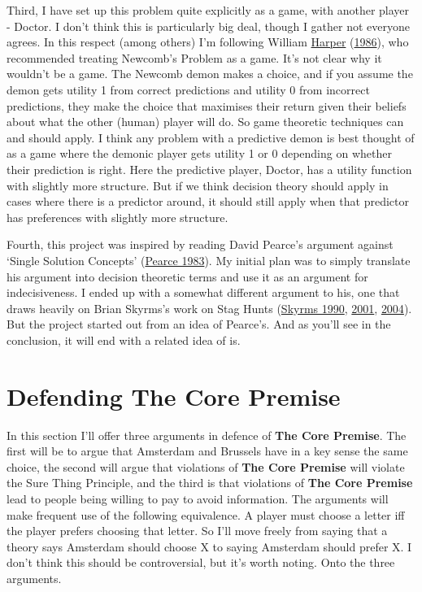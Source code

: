 \documentclass[
  12pt,
]{article}
\begin{document}
Third, I have set up this problem quite explicitly as a game, with
another player - Doctor. I don't think this is particularly big deal,
though I gather not everyone agrees. In this respect (among others) I'm
following William \protect\hyperlink{ref-Harper1986}{Harper}
(\protect\hyperlink{ref-Harper1986}{1986}), who recommended treating
Newcomb's Problem as a game. It's not clear why it wouldn't be a game.
The Newcomb demon makes a choice, and if you assume the demon gets
utility 1 from correct predictions and utility 0 from incorrect
predictions, they make the choice that maximises their return given
their beliefs about what the other (human) player will do. So game
theoretic techniques can and should apply. I think any problem with a
predictive demon is best thought of as a game where the demonic player
gets utility 1 or 0 depending on whether their prediction is right. Here
the predictive player, Doctor, has a utility function with slightly more
structure. But if we think decision theory should apply in cases where
there is a predictor around, it should still apply when that predictor
has preferences with slightly more structure.

Fourth, this project was inspired by reading David Pearce's argument
against `Single Solution Concepts'
(\protect\hyperlink{ref-Pearce1983}{Pearce 1983}). My initial plan was
to simply translate his argument into decision theoretic terms and use
it as an argument for indecisiveness. I ended up with a somewhat
different argument to his, one that draws heavily on Brian Skyrms's work
on Stag Hunts (\protect\hyperlink{ref-Skyrms1990}{Skyrms 1990},
\protect\hyperlink{ref-Skyrms2001}{2001},
\protect\hyperlink{ref-Skyrms2004}{2004}). But the project started out
from an idea of Pearce's. And as you'll see in the conclusion, it will
end with a related idea of is.

\hypertarget{defending-the-core-premise}{%
\section{Defending The Core Premise}\label{defending-the-core-premise}}

In this section I'll offer three arguments in defence of \textbf{The
Core Premise}. The first will be to argue that Amsterdam and Brussels
have in a key sense the same choice, the second will argue that
violations of \textbf{The Core Premise} will violate the Sure Thing
Principle, and the third is that violations of \textbf{The Core Premise}
lead to people being willing to pay to avoid information. The arguments
will make frequent use of the following equivalence. A player must
choose a letter iff the player prefers choosing that letter. So I'll
move freely from saying that a theory says Amsterdam should choose X to
saying Amsterdam should prefer X. I don't think this should be
controversial, but it's worth noting. Onto the three arguments.
\end{document}
